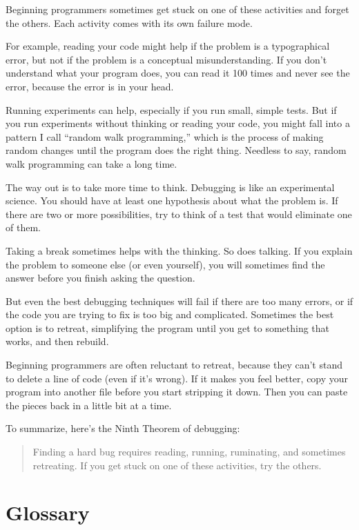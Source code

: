 Beginning programmers sometimes get stuck on one of these activities
and forget the others. Each activity comes with its own failure
mode.

For example, reading your code might help if the problem is a
typographical error, but not if the problem is a conceptual
misunderstanding. If you don't understand what your program does, you
can read it 100 times and never see the error, because the error is in
your head.

Running experiments can help, especially if you run small, simple
tests. But if you run experiments without thinking or reading your
code, you might fall into a pattern I call ``random walk programming,''
which is the process of making random changes until the program
does the right thing. Needless to say, random walk programming
can take a long time.

The way out is to take more time to think. Debugging is like an
experimental science. You should have at least one hypothesis about
what the problem is. If there are two or more possibilities, try to
think of a test that would eliminate one of them.

Taking a break sometimes helps with the thinking. So does talking.
If you explain the problem to someone else (or even yourself), you
will sometimes find the answer before you finish asking the question.

But even the best debugging techniques will fail if there are too many
errors, or if the code you are trying to fix is too big and
complicated. Sometimes the best option is to retreat, simplifying the
program until you get to something that works, and then rebuild.

Beginning programmers are often reluctant to retreat, because
they can't stand to delete a line of code (even if it's wrong).
If it makes you feel better, copy your program into another file
before you start stripping it down. Then you can paste the pieces
back in a little bit at a time.

To summarize, here's the Ninth Theorem of debugging:

\begin{quote}
Finding a hard bug requires reading, running, ruminating, and
sometimes retreating. If you get stuck on one of these activities,
try the others.
\end{quote}



\section{Glossary}

